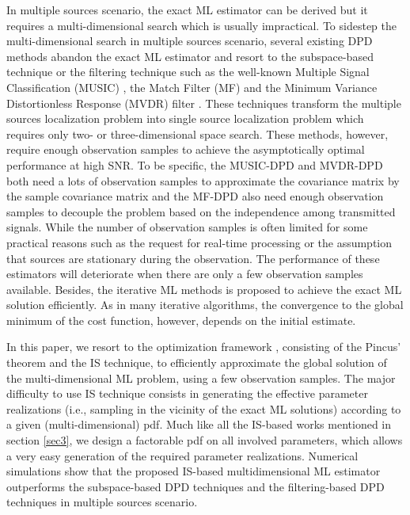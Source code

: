 \documentclass[review]{elsarticle}
\begin{document}
In multiple sources scenario, the exact ML estimator can be derived but it requires a multi-dimensional search which is usually impractical. To sidestep the multi-dimensional search in multiple sources scenario, several existing DPD methods abandon the exact ML estimator and resort to the subspace-based technique or the filtering technique such as the well-known Multiple Signal Classification (MUSIC) \cite{DPD2005}, the Match Filter (MF) \cite{2004Direct} and the Minimum Variance Distortionless Response (MVDR) filter \cite{Tirer2015High}. These techniques transform the multiple sources localization problem into single source localization problem which requires only two- or three-dimensional space search. 
These methods, however, require enough observation samples to achieve the asymptotically optimal performance at high SNR. To be specific, the MUSIC-DPD \cite{DPD2005} and MVDR-DPD \cite{Tirer2015High} both need a lots of observation samples to approximate the covariance matrix by the sample covariance matrix and the MF-DPD \cite{2004Direct} also need enough observation samples to decouple the problem based on the independence among transmitted signals. While the number of observation samples is often limited for some practical reasons such as the request for real-time processing or the assumption that sources are stationary during the observation. The performance of these estimators will deteriorate when there are only a few observation samples available. Besides, the iterative ML methods \cite{2006Efficient} is proposed to achieve the exact ML solution efficiently. As in many iterative algorithms, the convergence to the global minimum of the cost function, however, depends on the initial estimate.

In this paper, we resort to the optimization framework \cite{Kay2000Mean}, consisting of the Pincus' theorem \cite{Pincus1968A} and the IS technique, to efficiently approximate the global solution of the multi-dimensional ML problem, using a few observation samples. The major difficulty to use IS technique consists in generating the effective parameter realizations (i.e., sampling in the vicinity of the exact ML solutions) according to a given (multi-dimensional) pdf. Much like all the IS-based works mentioned in section \ref{sec3}, we design a factorable pdf on all involved parameters, which allows a very easy generation of the required parameter realizations. Numerical simulations show that the proposed IS-based multidimensional ML estimator outperforms the subspace-based DPD techniques and the filtering-based DPD techniques in multiple sources scenario.
\end{document}
